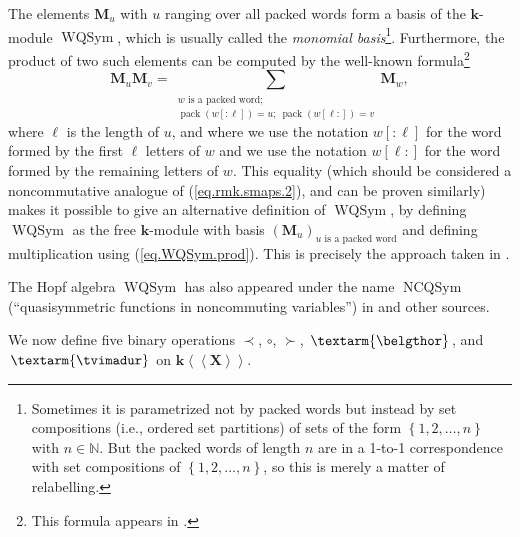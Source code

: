 \documentclass[numbers=enddot,12pt,final,onecolumn,notitlepage,abstracton]{scrartcl}%
\theoremstyle{definition}
\newcommand{\tvi}{\left. \textarm{\tvimadur} \right.}
\newcommand{\bel}{\left. \textarm{\belgthor} \right.}
\let\sumnonlimits\sum
\renewcommand{\sum}{\sumnonlimits\limits}
\begin{document}
The elements $\mathbf{M}_{u}$ with $u$ ranging over all packed words form a
basis of the $\mathbf{k}$-module $\operatorname*{WQSym}$, which is usually
called the \textit{monomial basis}\footnote{Sometimes it is parametrized not
by packed words but instead by set compositions (i.e., ordered set partitions)
of sets of the form $\left\{  1,2,\ldots,n\right\}  $ with $n\in\mathbb{N}$.
But the packed words of length $n$ are in a 1-to-1 correspondence with set
compositions of $\left\{  1,2,\ldots,n\right\}  $, so this is merely a matter
of relabelling.}. Furthermore, the product of two such elements can be
computed by the well-known formula\footnote{This formula appears in
\cite[Proposition 4.1]{MNT}.}%
\begin{equation}
\mathbf{M}_{u}\mathbf{M}_{v}=\sum_{\substack{w\text{ is a packed
word;}\\\operatorname*{pack}\left(  w\left[  :\ell\right]  \right)
=u;\ \operatorname*{pack}\left(  w\left[  \ell:\right]  \right)
=v}}\mathbf{M}_{w}, \label{eq.WQSym.prod}%
\end{equation}
where $\ell$ is the length of $u$, and where we use the notation $w\left[
:\ell\right]  $ for the word formed by the first $\ell$ letters of $w$ and we
use the notation $w\left[  \ell:\right]  $ for the word formed by the
remaining letters of $w$. This equality (which should be considered a
noncommutative analogue of (\ref{eq.rmk.smaps.2}), and can be proven
similarly) makes it possible to give an alternative definition of
$\operatorname*{WQSym}$, by defining $\operatorname*{WQSym}$ as the free
$\mathbf{k}$-module with basis $\left(  \mathbf{M}_{u}\right)  _{u\text{ is a
packed word}}$ and defining multiplication using (\ref{eq.WQSym.prod}). This
is precisely the approach taken in \cite[Section 1.1]{FM}.

The Hopf algebra $\operatorname*{WQSym}$ has also appeared under the name
$\operatorname*{NCQSym}$ (\textquotedblleft quasisymmetric functions in
noncommuting variables\textquotedblright) in \cite[Section 5.2]{BerZab} and
other sources.

We now define five binary operations $\left.  \prec\right.  $, $\circ$,
$\left.  \succ\right.  $, $\bel $, and $\tvi $ on $\mathbf{k}\left\langle
\left\langle \mathbf{X}\right\rangle \right\rangle $.
\end{document}
